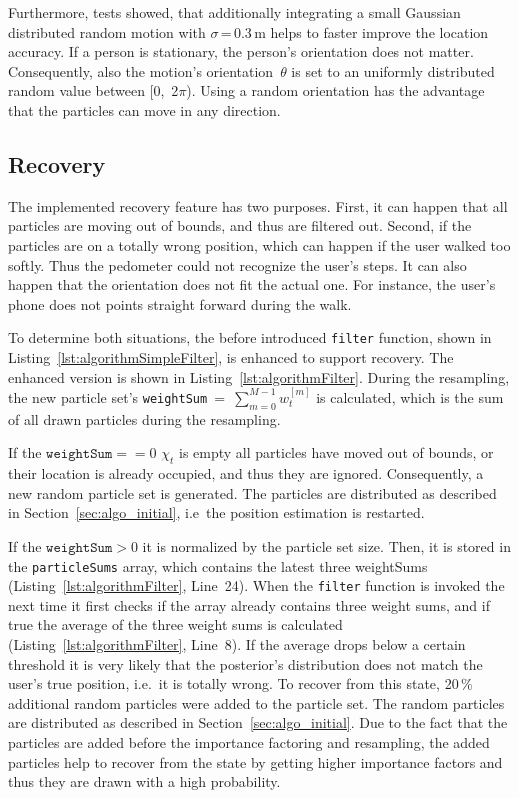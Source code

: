 Furthermore, tests showed, that additionally integrating a small Gaussian distributed random motion with $\sigma$\,=\,0.3\,m helps to faster improve the location accuracy. If a person is stationary, the person's orientation does not matter. Consequently, also the motion's orientation~$\theta$ is set to an uniformly distributed random value between [0,~2$\pi$). Using a random orientation has the advantage that the particles can move in any direction.




\subsection{Recovery}\label{sec:algo_recovery}
The implemented recovery feature has two purposes. First, it can happen that all particles are moving out of bounds, and thus are filtered out. Second, if the particles are on a totally wrong position, which can happen if the user walked too softly. Thus the pedometer could not recognize the user's steps. It can also happen that the orientation does not fit the actual one. For instance, the user's phone does not points straight forward during the walk.



To determine both situations, the before introduced \texttt{filter} function, shown in Listing~\ref{lst:algorithmSimpleFilter}, is enhanced to support recovery. The enhanced version is shown in Listing~\ref{lst:algorithmFilter}. During the resampling, the new particle set's \texttt{weightSum}~=~$\sum_{m = 0}^{M-1} w^{[m]}_t$ is calculated, which is the sum of all drawn particles during the resampling.

If the $\texttt{weightSum} == 0$ $\chi_t$ is empty all particles have moved out of bounds, or their location is already occupied, and thus they are ignored. Consequently, a new random particle set is generated. The particles are distributed as described in Section~\ref{sec:algo_initial}, i.e\ the position estimation is restarted.

If the $\texttt{weightSum} > 0$ it is normalized by the particle set size. Then, it is stored in the \texttt{particleSums} array, which contains the latest three weightSums (Listing~\ref{lst:algorithmFilter}, Line~24). When the \texttt{filter} function is invoked the next time it first checks if the array already contains three weight sums, and if true the average of the three weight sums is calculated (Listing~\ref{lst:algorithmFilter}, Line~8). If the average drops below a certain threshold it is very likely that the posterior's distribution does not match the user's true position, i.e.\ it is totally wrong. To recover from this state, 20\,\% additional random particles were added to the particle set. The random particles are distributed as described in Section~\ref{sec:algo_initial}. Due to the fact that the particles are added before the importance factoring and resampling, the added particles help to recover from the state by getting higher importance factors and thus they are drawn with a high probability.

